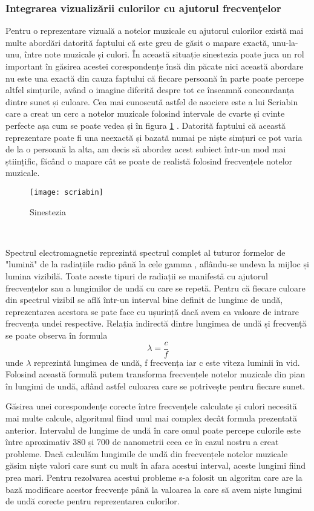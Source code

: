 \documentclass[../IoMusT.tex]{subfiles}
\begin{document}
\subsubsection{Integrarea vizualizării culorilor cu ajutorul frecvențelor}
Pentru o reprezentare vizuală a notelor muzicale cu ajutorul culorilor există mai multe abordări datorită faptului că este greu de găsit o mapare exactă, unu-la-unu, între note muzicale și culori. În această situație sinestezia poate juca un rol important în găsirea acestei corespondențe însă din păcate nici această abordare nu este una exactă din cauza faptului că fiecare persoană în parte poate percepe altfel simțurile, având o imagine diferită despre tot ce înseamnă conconrdanța dintre sunet și culoare. Cea mai cunoscută astfel de asociere este a lui Scriabin care a creat un cerc a notelor muzicale folosind intervale de cvarte și cvinte perfecte așa cum se poate vedea și în figura \ref{fig:scriabin} \cite{scriabin}. Datorită faptului că această reprezentare poate fi una neexactă și bazată numai pe niște simțuri ce pot varia de la o persoană la alta, am decis să abordez acest subiect într-un mod mai științific, făcând o mapare cât se poate de realistă folosind frecvențele notelor muzicale. 
\begin{figure}[h]
\centering
\texttt{[image: scriabin]}
\caption{Sinestezia}
\label{fig:scriabin}
\end{figure} 
\\
\par Spectrul electromagnetic reprezintă spectrul complet al tuturor formelor de "lumină" de la radiațiile radio până la cele gamma \cite{spectrum}, aflându-se undeva la mijloc și lumina vizibilă. Toate aceste tipuri de radiații se manifestă cu ajutorul frecvențelor sau a lungimilor de undă cu care se repetă. Pentru că fiecare culoare din spectrul vizibil se află într-un interval bine definit de lungime de undă, reprezentarea acestora se pate face cu ușurință dacă avem ca valoare de intrare frecvența undei respective. Relația indirectă dintre lungimea de undă și frecvență se poate observa în formula \[\lambda = \frac{c}{f}\] unde $\lambda$  reprezintă lungimea de undă, f frecvența iar c este viteza luminii în vid. Folosind această formulă putem transforma frecvențele notelor muzicale din pian în lungimi de undă, aflând astfel culoarea care se potrivește pentru fiecare sunet.
\\
\par Găsirea unei corespondențe corecte între frecvențele calculate și culori necesită mai multe calcule, algoritmul fiind unul mai complex decât formula prezentată anterior. Intervalul de lungime de undă în care omul poate percepe culorile este între aproximativ 380 și 700 de nanometrii ceea ce în cazul nostru a creat probleme. Dacă calculăm lungimile de undă din frecvențele notelor muzicale găsim niște valori care sunt cu mult în afara acestui interval, aceste lungimi fiind prea mari. Pentru rezolvarea acestui probleme s-a folosit un algoritm care are la bază modificare acestor frecvențe până la valoarea la care să avem niște lungimi de undă corecte pentru reprezentarea culorilor.
\end{document}
